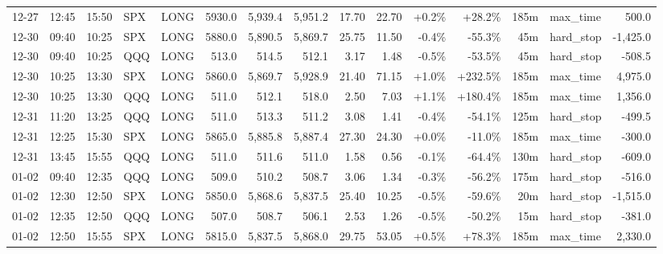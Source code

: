 \documentclass[11pt,a4paper,twoside]{article}
\begin{document}
\begin{landscape}
\begin{center}
\begin{longtable}{>{\color{txtmain}}l l l l l r r r r r r r r >{\color{txtmain}}l r}
12-27 & 12:45 & 15:50 & SPX & LONG & 5930.0 & 5,939.4 & 5,951.2 & 17.70 & 22.70 & \textcolor{wingreen}{+0.2\%} & \textcolor{wingreen}{+28.2\%} & 185m & max\_time & \textcolor{wingreen}{500.0} \\
12-30 & 09:40 & 10:25 & SPX & LONG & 5880.0 & 5,890.5 & 5,869.7 & 25.75 & 11.50 & \textcolor{lossred}{-0.4\%} & \textcolor{lossred}{-55.3\%} & 45m & hard\_stop & \textcolor{lossred}{-1,425.0} \\
12-30 & 09:40 & 10:25 & QQQ & LONG & 513.0 & 514.5 & 512.1 & 3.17 & 1.48 & \textcolor{lossred}{-0.5\%} & \textcolor{lossred}{-53.5\%} & 45m & hard\_stop & \textcolor{lossred}{-508.5} \\
12-30 & 10:25 & 13:30 & SPX & LONG & 5860.0 & 5,869.7 & 5,928.9 & 21.40 & 71.15 & \textcolor{wingreen}{+1.0\%} & \textcolor{wingreen}{+232.5\%} & 185m & max\_time & \textcolor{wingreen}{4,975.0} \\
12-30 & 10:25 & 13:30 & QQQ & LONG & 511.0 & 512.1 & 518.0 & 2.50 & 7.03 & \textcolor{wingreen}{+1.1\%} & \textcolor{wingreen}{+180.4\%} & 185m & max\_time & \textcolor{wingreen}{1,356.0} \\
12-31 & 11:20 & 13:25 & QQQ & LONG & 511.0 & 513.3 & 511.2 & 3.08 & 1.41 & \textcolor{lossred}{-0.4\%} & \textcolor{lossred}{-54.1\%} & 125m & hard\_stop & \textcolor{lossred}{-499.5} \\
12-31 & 12:25 & 15:30 & SPX & LONG & 5865.0 & 5,885.8 & 5,887.4 & 27.30 & 24.30 & \textcolor{wingreen}{+0.0\%} & \textcolor{lossred}{-11.0\%} & 185m & max\_time & \textcolor{lossred}{-300.0} \\
12-31 & 13:45 & 15:55 & QQQ & LONG & 511.0 & 511.6 & 511.0 & 1.58 & 0.56 & \textcolor{lossred}{-0.1\%} & \textcolor{lossred}{-64.4\%} & 130m & hard\_stop & \textcolor{lossred}{-609.0} \\
01-02 & 09:40 & 12:35 & QQQ & LONG & 509.0 & 510.2 & 508.7 & 3.06 & 1.34 & \textcolor{lossred}{-0.3\%} & \textcolor{lossred}{-56.2\%} & 175m & hard\_stop & \textcolor{lossred}{-516.0} \\
01-02 & 12:30 & 12:50 & SPX & LONG & 5850.0 & 5,868.6 & 5,837.5 & 25.40 & 10.25 & \textcolor{lossred}{-0.5\%} & \textcolor{lossred}{-59.6\%} & 20m & hard\_stop & \textcolor{lossred}{-1,515.0} \\
01-02 & 12:35 & 12:50 & QQQ & LONG & 507.0 & 508.7 & 506.1 & 2.53 & 1.26 & \textcolor{lossred}{-0.5\%} & \textcolor{lossred}{-50.2\%} & 15m & hard\_stop & \textcolor{lossred}{-381.0} \\
01-02 & 12:50 & 15:55 & SPX & LONG & 5815.0 & 5,837.5 & 5,868.0 & 29.75 & 53.05 & \textcolor{wingreen}{+0.5\%} & \textcolor{wingreen}{+78.3\%} & 185m & max\_time & \textcolor{wingreen}{2,330.0} \\

\end{longtable}
\end{center}
\end{landscape}
\end{document}
